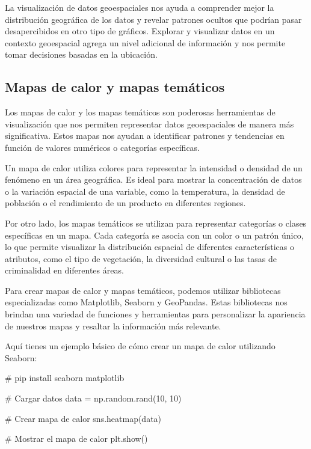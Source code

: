 \documentclass[
  a4paper,
]{article}
\newenvironment{Shaded}{}{}
\newcommand{\CommentTok}[1]{\textcolor[rgb]{0.42,0.45,0.49}{#1}}
\newcommand{\DecValTok}[1]{\textcolor[rgb]{0.00,0.36,0.77}{#1}}
\newcommand{\NormalTok}[1]{\textcolor[rgb]{0.14,0.16,0.18}{#1}}
\newcommand{\OperatorTok}[1]{\textcolor[rgb]{0.14,0.16,0.18}{#1}}
\begin{document}
La visualización de datos geoespaciales nos ayuda a comprender mejor la
distribución geográfica de los datos y revelar patrones ocultos que
podrían pasar desapercibidos en otro tipo de gráficos. Explorar y
visualizar datos en un contexto geoespacial agrega un nivel adicional de
información y nos permite tomar decisiones basadas en la ubicación.

\hypertarget{mapas-de-calor-y-mapas-temuxe1ticos}{%
\subsection{Mapas de calor y mapas
temáticos}\label{mapas-de-calor-y-mapas-temuxe1ticos}}

Los mapas de calor y los mapas temáticos son poderosas herramientas de
visualización que nos permiten representar datos geoespaciales de manera
más significativa. Estos mapas nos ayudan a identificar patrones y
tendencias en función de valores numéricos o categorías específicas.

Un mapa de calor utiliza colores para representar la intensidad o
densidad de un fenómeno en un área geográfica. Es ideal para mostrar la
concentración de datos o la variación espacial de una variable, como la
temperatura, la densidad de población o el rendimiento de un producto en
diferentes regiones.

Por otro lado, los mapas temáticos se utilizan para representar
categorías o clases específicas en un mapa. Cada categoría se asocia con
un color o un patrón único, lo que permite visualizar la distribución
espacial de diferentes características o atributos, como el tipo de
vegetación, la diversidad cultural o las tasas de criminalidad en
diferentes áreas.

Para crear mapas de calor y mapas temáticos, podemos utilizar
bibliotecas especializadas como Matplotlib, Seaborn y GeoPandas. Estas
bibliotecas nos brindan una variedad de funciones y herramientas para
personalizar la apariencia de nuestros mapas y resaltar la información
más relevante.

Aquí tienes un ejemplo básico de cómo crear un mapa de calor utilizando
Seaborn:

\begin{Shaded}
\begin{Highlighting}[]
\CommentTok{\# pip install seaborn matplotlib}

\CommentTok{\# Cargar datos}
\NormalTok{data }\OperatorTok{=}\NormalTok{ np.random.rand(}\DecValTok{10}\NormalTok{, }\DecValTok{10}\NormalTok{)}

\CommentTok{\# Crear mapa de calor}
\NormalTok{sns.heatmap(data)}

\CommentTok{\# Mostrar el mapa de calor}
\NormalTok{plt.show()}
\end{Highlighting}
\end{Shaded}
\end{document}
